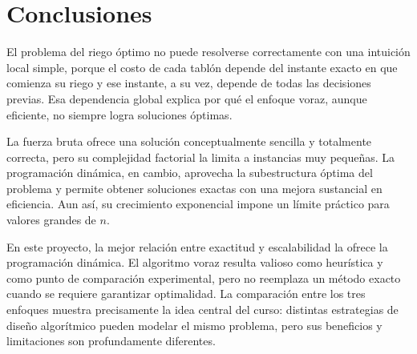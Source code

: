\documentclass[12pt,a4paper]{article}
\begin{document}
\section{Conclusiones}

El problema del riego \'optimo no puede resolverse correctamente con una intuici\'on local simple, porque el costo de cada tabl\'on depende del instante exacto en que comienza su riego y ese instante, a su vez, depende de todas las decisiones previas. Esa dependencia global explica por qu\'e el enfoque voraz, aunque eficiente, no siempre logra soluciones \'optimas.

La fuerza bruta ofrece una soluci\'on conceptualmente sencilla y totalmente correcta, pero su complejidad factorial la limita a instancias muy peque\~nas. La programaci\'on din\'amica, en cambio, aprovecha la subestructura \'optima del problema y permite obtener soluciones exactas con una mejora sustancial en eficiencia. Aun as\'i, su crecimiento exponencial impone un l\'imite pr\'actico para valores grandes de \(n\).

En este proyecto, la mejor relaci\'on entre exactitud y escalabilidad la ofrece la programaci\'on din\'amica. El algoritmo voraz resulta valioso como heur\'istica y como punto de comparaci\'on experimental, pero no reemplaza un m\'etodo exacto cuando se requiere garantizar optimalidad. La comparaci\'on entre los tres enfoques muestra precisamente la idea central del curso: distintas estrategias de dise\~no algor\'itmico pueden modelar el mismo problema, pero sus beneficios y limitaciones son profundamente diferentes.
\end{document}
